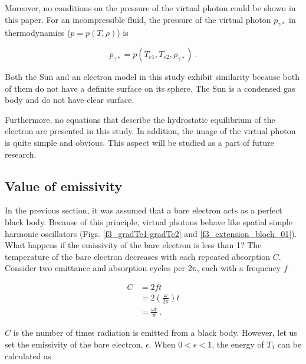\documentclass[%
 reprint,
 amsmath,amssymb,
 aps,
]{revtex4-1}
\numberwithin{equation}{section}%
\begin{document}
    Moreover, no conditions on the pressure of the virtual photon could be shown in this paper. For an incompressible fluid, the pressure of the virtual photon $p_{\gamma *}$ in thermodynamics ($p = p (T, \rho)$) is
        
        \begin{equation}
            p_{\gamma *} = p (T_{e1}, T_{e2}, \rho_{\gamma *})
            \ .
        \end{equation}

    Both the Sun and an electron model in this study exhibit similarity because both of them do not have a definite surface on its sphere. The Sun is a condensed gas body and do not have clear surface.

    Furthermore, no equations that describe the hydrostatic equilibrium of the electron are presented in this study. In addition, the image of the virtual photon is quite simple and obvious. This aspect will be studied as a part of future research.




\subsection{Value of emissivity}

    In the previous section, it was assumed that a bare electron acts as a perfect black body. Because of this principle, virtual photons behave like spatial simple harmonic oscillators (Figs. \ref{f3_gradTe1-gradTe2} and \ref{f3_extension_bloch_01}). What happens if the emissivity of the bare electron is less than 1? The temperature of the bare electron decreases with each repeated absorption $ C $. Consider two emittance and absorption cycles per $\mathrm{2 \pi}$, each with a frequency $f$
        
        \begin{equation}
            \begin{split}
                C 
                    &= 2 f t \\
                    &= 2 \left( \frac{\omega}{2 \pi} \right) t \\
                        &= \frac{\omega t}{\pi}
                        \ .
            \end{split}
        \end{equation}
            
    $C$ is the number of times radiation is emitted from a black body. However, let us set the emissivity of the bare electron, $\epsilon$. When $0 < \epsilon < 1$, the energy of $T_{1}$ can be calculated as
\end{document}
